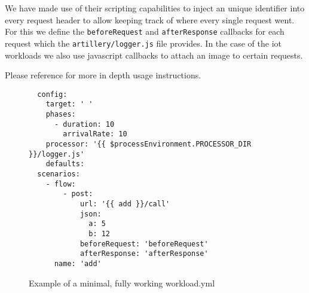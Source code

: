 \documentclass[../main.tex]{subfiles}
\begin{document}
We have made use of their scripting capabilities to inject an unique identifier 
into every request header to allow keeping track of where every single request went. 
For this we define the \texttt{beforeRequest} and \texttt{afterResponse} callbacks for each request 
which the \texttt{artillery/logger.js} file provides.
In the case of the iot workloads we also use javascript callbacks to attach an image to certain requests.

Please reference  for more in depth usage instructions.

\begin{figure}[H]
  \begin{tcolorbox}[titleDetachedStyle, title=\texttt{workload.yml}]
  \begin{verbatim}
  config:
    target: ' '
    phases:
      - duration: 10
        arrivalRate: 10
    processor: '{{ $processEnvironment.PROCESSOR_DIR }}/logger.js'
    defaults:
  scenarios:
    - flow:
        - post:
            url: '{{ add }}/call'
            json:
              a: 5
              b: 12
            beforeRequest: 'beforeRequest'
            afterResponse: 'afterResponse'
      name: 'add'
  \end{verbatim}
\end{tcolorbox}
\caption{Example of a minimal, fully working workload.yml}
\label{fig:exampleWorkloadYML}
\end{figure}
\end{document}
